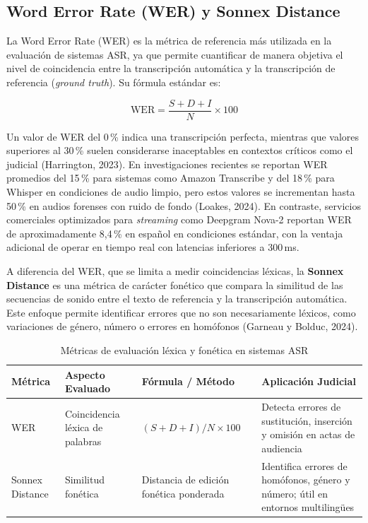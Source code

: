 \documentclass[12pt,a4paper,oneside]{report}
\begin{document}
\subsection{Word Error Rate (WER) y Sonnex Distance}

La Word Error Rate (WER) es la métrica de referencia más utilizada en la evaluación de sistemas ASR, ya que permite cuantificar de manera objetiva el nivel de coincidencia entre la transcripción automática y la transcripción de referencia (\textit{ground truth}). Su fórmula estándar es:

\begin{equation}
\text{WER} = \frac{S + D + I}{N} \times 100
\end{equation}

Un valor de WER del 0\,\% indica una transcripción perfecta, mientras que valores superiores al 30\,\% suelen considerarse inaceptables en contextos críticos como el judicial (Harrington, 2023). En investigaciones recientes se reportan WER promedios del 15\,\% para sistemas como Amazon Transcribe y del 18\,\% para Whisper en condiciones de audio limpio, pero estos valores se incrementan hasta 50\,\% en audios forenses con ruido de fondo (Loakes, 2024). En contraste, servicios comerciales optimizados para \textit{streaming} como Deepgram Nova-2 reportan WER de aproximadamente 8,4\,\% en español en condiciones estándar, con la ventaja adicional de operar en tiempo real con latencias inferiores a 300\,ms.

A diferencia del WER, que se limita a medir coincidencias léxicas, la \textbf{Sonnex Distance} es una métrica de carácter fonético que compara la similitud de las secuencias de sonido entre el texto de referencia y la transcripción automática. Este enfoque permite identificar errores que no son necesariamente léxicos, como variaciones de género, número o errores en homófonos (Garneau y Bolduc, 2024).

\begin{table}[H]
\centering
\caption{Métricas de evaluación léxica y fonética en sistemas ASR}
\begin{tabular}{|p{3cm}|p{3cm}|p{4cm}|p{3cm}|}
\hline
\rowcolor{gray!20}
\textbf{Métrica} & \textbf{Aspecto Evaluado} & \textbf{Fórmula / Método} & \textbf{Aplicación Judicial} \\
\hline
WER & Coincidencia léxica de palabras & $(S+D+I)/N \times 100$ & Detecta errores de sustitución, inserción y omisión en actas de audiencia \\
\hline
Sonnex Distance & Similitud fonética & Distancia de edición fonética ponderada & Identifica errores de homófonos, género y número; útil en entornos multilingües \\
\hline
\end{tabular}
\label{tab:wer_sonnex}
\end{table}
\end{document}
